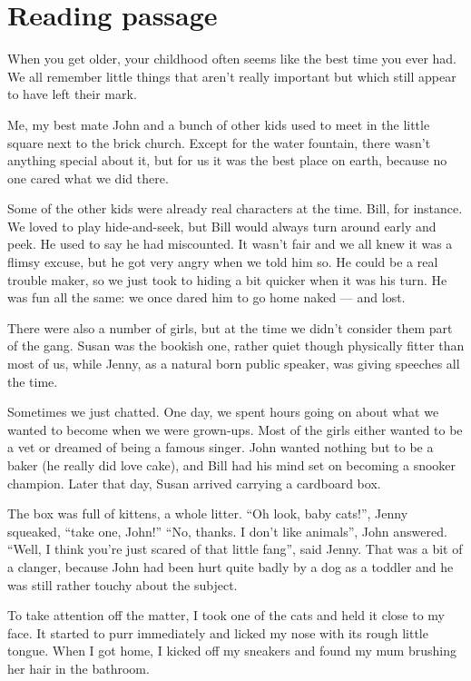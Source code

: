 \chapter{Reading passage}
\label{app.reading}
When you get older, your childhood often seems like the best time you ever had. We all remember little things that aren't really important but which still appear to have left their mark.

Me, my best mate John and a bunch of other kids used to meet in the little square next to the brick church. Except for the water fountain, there wasn't anything special about it, but for us it was the best place on earth, because no one cared what we did there.

Some of the other kids were already real characters at the time. Bill, for instance. We loved to play hide-and-seek, but Bill would always turn around early and peek. He used to say he had miscounted. It wasn't fair and we all knew it was a flimsy excuse, but he got very angry when we told him so. He could be a real trouble maker, so we just took to hiding a bit quicker when it was his turn. He was fun all the same: we once dared him to go home naked --- and lost.

There were also a number of girls, but at the time we didn't consider them part of the gang. Susan was the bookish one, rather quiet though physically fitter than most of us, while Jenny, as a natural born public speaker, was giving speeches all the time.

Sometimes we just chatted. One day, we spent hours going on about what we wanted to become when we were grown-ups. Most of the girls either wanted to be a vet or dreamed of being a famous singer. John wanted nothing but to be a baker (he really did love cake), and Bill had his mind set on becoming a snooker champion.
Later that day, Susan arrived carrying a cardboard box.

The box was full of kittens, a whole litter. ``Oh look, baby cats!'', Jenny squeaked, ``take one, John!'' ``No, thanks. I don't like animals'', John answered. ``Well, I think you're just scared of that little fang'', said Jenny. That was a bit of a clanger, because John had been hurt quite badly by a dog as a toddler and he was still rather touchy about the subject.

To take attention off the matter, I took one of the cats and held it close to my face. It started to purr immediately and licked my nose with its rough little tongue.
When I got home, I kicked off my sneakers and found my mum brushing her hair in the bathroom.

